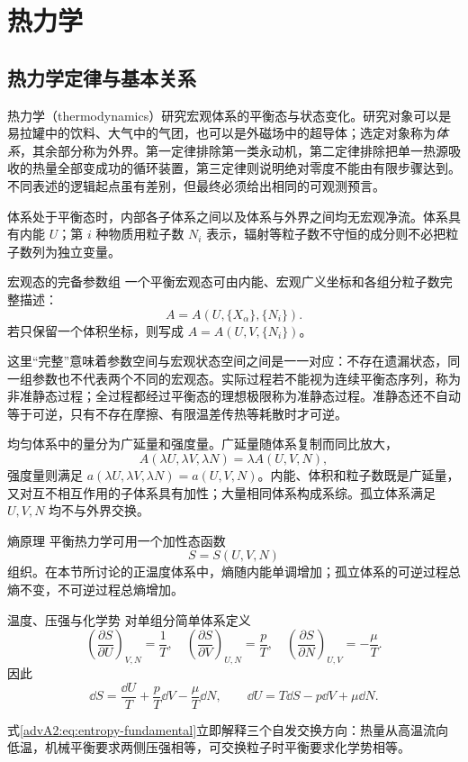 
\begingroup


\section{热力学}

\subsection{热力学定律与基本关系}

热力学（thermodynamics）研究宏观体系的平衡态与状态变化。研究对象可以是易拉罐中的饮料、大气中的气团，也可以是外磁场中的超导体；选定对象称为\emph{体系}，其余部分称为外界。第一定律排除第一类永动机，第二定律排除把单一热源吸收的热量全部变成功的循环装置，第三定律则说明绝对零度不能由有限步骤达到。不同表述的逻辑起点虽有差别，但最终必须给出相同的可观测预言。

体系处于平衡态时，内部各子体系之间以及体系与外界之间均无宏观净流。体系具有内能 $U$；第 $i$ 种物质用粒子数 $N_i$ 表示，辐射等粒子数不守恒的成分则不必把粒子数列为独立变量。

\begin{advtheorem}{宏观态的完备参数组}\label{advA2:thm:macrostate}
一个平衡宏观态可由内能、宏观广义坐标和各组分粒子数完整描述：
\[
 A=A(U,\{X_\alpha\},\{N_i\}).
\]
若只保留一个体积坐标，则写成 $A=A(U,V,\{N_i\})$。
\end{advtheorem}
这里“完整”意味着参数空间与宏观状态空间之间是一一对应：不存在遗漏状态，同一组参数也不代表两个不同的宏观态。实际过程若不能视为连续平衡态序列，称为非准静态过程；全过程都经过平衡态的理想极限称为准静态过程。准静态还不自动等于可逆，只有不存在摩擦、有限温差传热等耗散时才可逆。

均匀体系中的量分为广延量和强度量。广延量随体系复制而同比放大，
\[
 A(\lambda U,\lambda V,\lambda N)=\lambda A(U,V,N),
\]
强度量则满足 $a(\lambda U,\lambda V,\lambda N)=a(U,V,N)$。内能、体积和粒子数既是广延量，又对互不相互作用的子体系具有加性；大量相同体系构成系综。孤立体系满足 $U,V,N$ 均不与外界交换。

\begin{advtheorem}{熵原理}\label{advA2:thm:entropy-principle}
平衡热力学可用一个加性态函数
\[
 S=S(U,V,N)
\]
组织。在本节所讨论的正温度体系中，熵随内能单调增加；孤立体系的可逆过程总熵不变，不可逆过程总熵增加。
\end{advtheorem}

\begin{advdefinition}{温度、压强与化学势}\label{advA2:def:intensives}
对单组分简单体系定义
\[
 \left(\frac{\partial S}{\partial U}\right)_{V,N}=\frac1T,
 \quad
 \left(\frac{\partial S}{\partial V}\right)_{U,N}=\frac pT,
 \quad
 \left(\frac{\partial S}{\partial N}\right)_{U,V}=-\frac\mu T.
\]
因此
\begin{equation}\label{advA2:eq:entropy-fundamental}
 \dd S=\frac{\dd U}{T}+\frac pT\dd V-\frac\mu T\dd N,
 \qquad
 \dd U=T\dd S-p\dd V+\mu\dd N.
\end{equation}
\end{advdefinition}
式\eqref{advA2:eq:entropy-fundamental}立即解释三个自发交换方向：热量从高温流向低温，机械平衡要求两侧压强相等，可交换粒子时平衡要求化学势相等。


